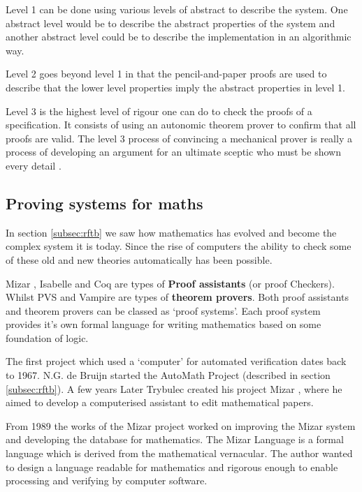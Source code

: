 Level 1 can be done using various levels of abstract to describe the system. One abstract level would be to describe the abstract properties of the system and another abstract level could be to describe the implementation in an algorithmic way.

Level 2 goes beyond level 1 in that the pencil-and-paper proofs are used to describe that the lower level properties imply the abstract properties in level 1.

Level 3 is the highest level of rigour one can do to check the proofs of a specification. It consists of using an autonomic theorem prover to confirm that all proofs are valid. The level 3 process of convincing a mechanical prover is really a process of developing an argument for an ultimate sceptic who must be shown every detail \cite{encyclopedia}.

\subsection{Proving systems for maths}

In section \ref{subsec:rftb} we saw how mathematics has evolved and become the complex system it is today. Since the rise of computers the ability to check some of these old and new theories automatically has been possible.

Mizar \cite{mizar}, Isabelle \cite{isabelle} and Coq \cite{coq} are types of \textbf{Proof assistants} (or proof Checkers). Whilst PVS and Vampire are types of \textbf{theorem provers}. Both proof assistants and theorem provers can be classed as `proof systems'.
Each proof system provides it's own formal language for writing mathematics based on some foundation of logic.

The first project which used a `computer' for automated verification dates back to 1967. N.G. de Bruijn started the AutoMath Project (described in section \ref{subsec:rftb}). A few years Later Trybulec created his project Mizar \cite{mizar}, where he aimed to develop a computerised assistant to edit mathematical papers.

From 1989 the works of the Mizar project worked on improving the Mizar system and developing the database for mathematics. The Mizar Language is a formal language which is derived from the mathematical vernacular. The author wanted to design a language readable for mathematics and rigorous enough to enable processing and verifying by computer software.

